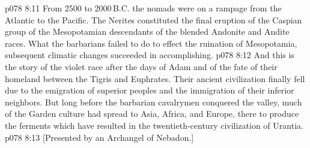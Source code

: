 \vs p078 8:11 From 2500 to 2000\,B.C. the nomads were on a rampage from the Atlantic to the Pacific. The Nerites constituted the final eruption of the Caspian group of the Mesopotamian descendants of the blended Andonite and Andite races. What the barbarians failed to do to effect the ruination of Mesopotamia, subsequent climatic changes succeeded in accomplishing.
\vs p078 8:12 \pc And this is the story of the violet race after the days of Adam and of the fate of their homeland between the Tigris and Euphrates. Their ancient civilization finally fell due to the emigration of superior peoples and the immigration of their inferior neighbors. But long before the barbarian cavalrymen conquered the valley, much of the Garden culture had spread to Asia, Africa, and Europe, there to produce the ferments which have resulted in the twentieth\hyp{}century civilization of Urantia.
\vsetoff
\vs p078 8:13 [Presented by an Archangel of Nebadon.]
